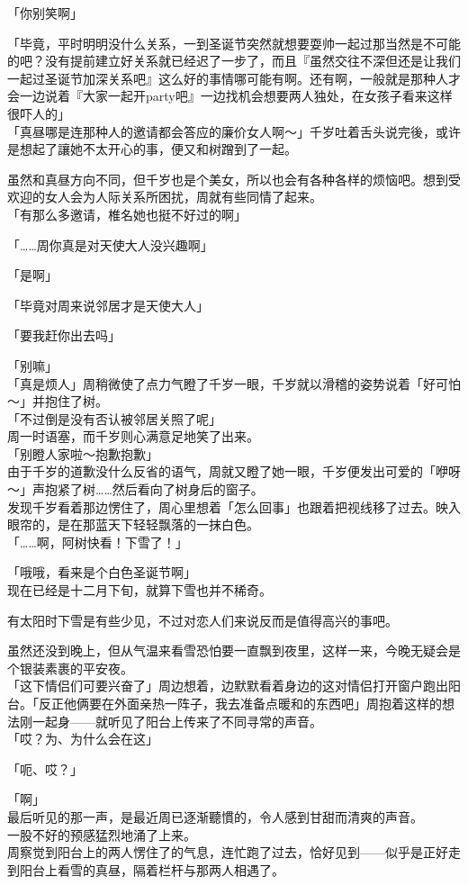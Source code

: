 「你别笑啊」

「毕竟，平时明明没什么关系，一到圣诞节突然就想要耍帅一起过那当然是不可能的吧？没有提前建立好关系就已经迟了一步了，而且『虽然交往不深但还是让我们一起过圣诞节加深关系吧』这么好的事情哪可能有啊。还有啊，一般就是那种人才会一边说着『大家一起开party吧』一边找机会想要两人独处，在女孩子看来这样很吓人的」\\

「真昼哪是连那种人的邀请都会答应的廉价女人啊～」千岁吐着舌头说完後，或许是想起了讓她不太开心的事，便又和树蹭到了一起。

虽然和真昼方向不同，但千岁也是个美女，所以也会有各种各样的烦恼吧。想到受欢迎的女人会为人际关系所困扰，周就有些同情了起来。\\

「有那么多邀请，椎名她也挺不好过的啊」

「……周你真是对天使大人没兴趣啊」

「是啊」

「毕竟对周来说邻居才是天使大人」

「要我赶你出去吗」

「别嘛」\\

「真是烦人」周稍微使了点力气瞪了千岁一眼，千岁就以滑稽的姿势说着「好可怕～」并抱住了树。\\

「不过倒是没有否认被邻居关照了呢」\\

周一时语塞，而千岁则心满意足地笑了出来。\\

「别瞪人家啦～抱歉抱歉」\\

由于千岁的道歉没什么反省的语气，周就又瞪了她一眼，千岁便发出可爱的「咿呀～」声抱紧了树……然后看向了树身后的窗子。\\

发现千岁看着那边愣住了，周心里想着「怎么回事」也跟着把视线移了过去。映入眼帘的，是在那蓝天下轻轻飘落的一抹白色。\\

「……啊，阿树快看！下雪了！」

「哦哦，看来是个白色圣诞节啊」\\

现在已经是十二月下旬，就算下雪也并不稀奇。

有太阳时下雪是有些少见，不过对恋人们来说反而是值得高兴的事吧。

虽然还没到晚上，但从气温来看雪恐怕要一直飘到夜里，这样一来，今晚无疑会是个银装素裹的平安夜。\\

「这下情侣们可要兴奋了」周边想着，边默默看着身边的这对情侣打开窗户跑出阳台。「反正他俩要在外面亲热一阵子，我去准备点暖和的东西吧」周抱着这样的想法刚一起身——就听见了阳台上传来了不同寻常的声音。\\

「哎？为、为什么会在这」

「呃、哎？」

「啊」\\

最后听见的那一声，是最近周已逐渐聽慣的，令人感到甘甜而清爽的声音。\\

一股不好的预感猛烈地涌了上来。\\

周察觉到阳台上的两人愣住了的气息，连忙跑了过去，恰好见到——似乎是正好走到阳台上看雪的真昼，隔着栏杆与那两人相遇了。
